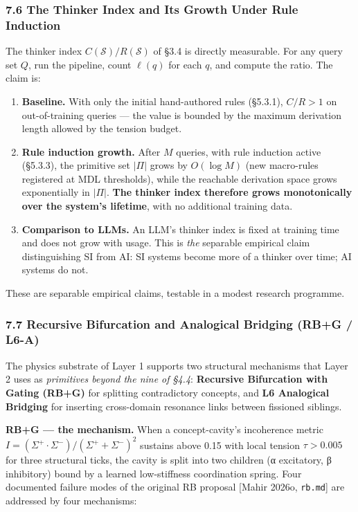 \documentclass[
  11pt,
  a4paper,
]{article}
\providecommand{\tightlist}{%
  \setlength{\itemsep}{0pt}\setlength{\parskip}{0pt}}
\begin{document}
\subsubsection{7.6 The Thinker Index and Its Growth Under Rule
Induction}\label{the-thinker-index-and-its-growth-under-rule-induction}

The thinker index \(C(\mathcal{S})/R(\mathcal{S})\) of §3.4 is directly
measurable. For any query set \(Q\), run the pipeline, count \(\ell(q)\)
for each \(q\), and compute the ratio. The claim is:

\begin{enumerate}
\def\labelenumi{\arabic{enumi}.}
\tightlist
\item
  \textbf{Baseline.} With only the initial hand-authored rules (§5.3.1),
  \(C/R > 1\) on out-of-training queries --- the value is bounded by the
  maximum derivation length allowed by the tension budget.
\item
  \textbf{Rule induction growth.} After \(M\) queries, with rule
  induction active (§5.3.3), the primitive set \(|\Pi|\) grows by
  \(O(\log M)\) (new macro-rules registered at MDL thresholds), while
  the reachable derivation space grows exponentially in \(|\Pi|\).
  \textbf{The thinker index therefore grows monotonically over the
  system's lifetime}, with no additional training data.
\item
  \textbf{Comparison to LLMs.} An LLM's thinker index is fixed at
  training time and does not grow with usage. This is \emph{the}
  separable empirical claim distinguishing SI from AI: SI systems become
  more of a thinker over time; AI systems do not.
\end{enumerate}

These are separable empirical claims, testable in a modest research
programme.

\subsubsection{7.7 Recursive Bifurcation and Analogical Bridging (RB+G /
L6-A)}\label{recursive-bifurcation-and-analogical-bridging-rbg-l6-a}

The physics substrate of Layer 1 supports two structural mechanisms that
Layer 2 uses as \emph{primitives beyond the nine of §4.4}:
\textbf{Recursive Bifurcation with Gating (RB+G)} for splitting
contradictory concepts, and \textbf{L6 Analogical Bridging} for
inserting cross-domain resonance links between fissioned siblings.

\textbf{RB+G --- the mechanism.} When a concept-cavity's incoherence
metric \(I = (\Sigma^+ \cdot \Sigma^-) / (\Sigma^+ + \Sigma^-)^2\)
sustains above 0.15 with local tension \(\tau > 0.005\) for three
structural ticks, the cavity is split into two children (α excitatory, β
inhibitory) bound by a learned low-stiffness coordination spring. Four
documented failure modes of the original RB proposal {[}Mahir 2026o,
\texttt{rb.md}{]} are addressed by four mechanisms:
\end{document}

